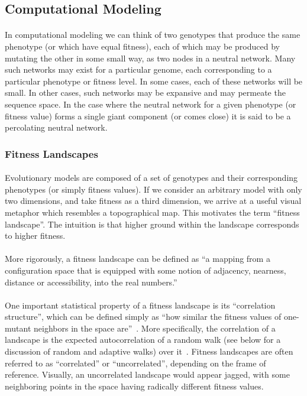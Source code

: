 \documentclass[12pt,letterpaper,titlepage]{article}
\begin{document}
\subsection{Computational Modeling}

\paragraph{}
In computational modeling we can think of two genotypes that produce the same
phenotype (or which have equal fitness), each of which may be produced by
mutating the other in some small way, as two nodes in a neutral network. Many
such networks may exist for a particular genome, each corresponding to a
particular phenotype or fitness level. In some cases, each of these networks
will be small. In other cases, such networks may be expansive and may permeate
the sequence space. In the case where the neutral network for a given phenotype
(or fitness value) forms a single giant component (or comes close) it is said
to be a percolating neutral network.

\subsubsection{Fitness Landscapes}

\paragraph{}
Evolutionary models are composed of a set of genotypes and their corresponding
phenotypes (or simply fitness values).  If we consider an arbitrary model with
only two dimensions, and take fitness as a third dimension, we arrive at a
useful visual metaphor which resembles a topographical map. This motivates the
term ``fitness landscape''. The intuition is that higher ground within the
landscape corresponds to higher fitness.

\paragraph{}
More rigorously, a fitness landscape can be defined as ``a mapping from a
configuration space that is equipped with some notion of adjacency, nearness,
distance or accessibility, into the real numbers.''~\cite{Calcott2008}

\paragraph{}
One important statistical property of a fitness landscape is its ``correlation
structure'', which can be defined simply as ``how similar the fitness values of
one-mutant neighbors in the space are''~\cite{Kauffman1993}. More specifically,
the correlation of a landscape is the expected autocorrelation of a random walk
(see below for a discussion of random and adaptive walks) over
it~\cite{Weinberger1990}. Fitness landscapes are often referred to as
``correlated'' or ``uncorrelated'', depending on the frame of reference.
Visually, an uncorrelated landscape would appear jagged, with some neighboring
points in the space having radically different fitness values.
\end{document}
